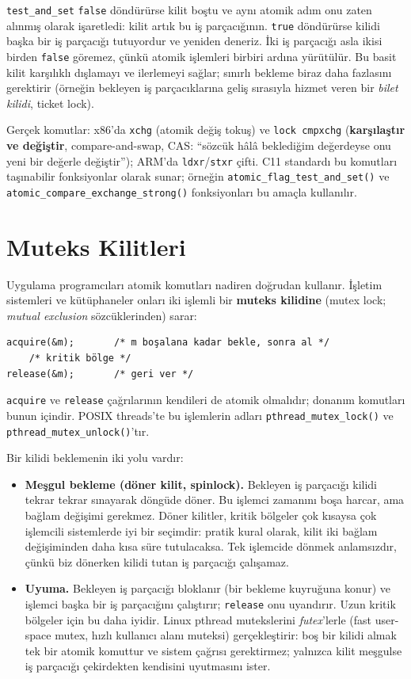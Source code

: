 \documentclass[11pt,a4paper]{article}
\newcommand{\term}[1]{\textbf{\color{mintdeep}#1}}
\newcommand{\cmd}[1]{\texttt{#1}}
\begin{document}
\texttt{test\_and\_set} \texttt{false} döndürürse kilit boştu ve aynı atomik adım onu zaten alınmış olarak işaretledi: kilit artık bu iş parçacığının. \texttt{true} döndürürse kilidi başka bir iş parçacığı tutuyordur ve yeniden deneriz. İki iş parçacığı asla ikisi birden \texttt{false} göremez, çünkü atomik işlemleri birbiri ardına yürütülür. Bu basit kilit karşılıklı dışlamayı ve ilerlemeyi sağlar; sınırlı bekleme biraz daha fazlasını gerektirir (örneğin bekleyen iş parçacıklarına geliş sırasıyla hizmet veren bir \emph{bilet kilidi}, ticket lock).

Gerçek komutlar: x86'da \texttt{xchg} (atomik değiş tokuş) ve \texttt{lock cmpxchg} (\term{karşılaştır ve değiştir}, compare-and-swap, CAS: ``sözcük hâlâ beklediğim değerdeyse onu yeni bir değerle değiştir''); ARM'da \texttt{ldxr}/\texttt{stxr} çifti. C11 standardı bu komutları taşınabilir fonksiyonlar olarak sunar; örneğin \texttt{atomic\_flag\_\allowbreak test\_and\_set()} ve \texttt{atomic\_compare\_\allowbreak exchange\_strong()} fonksiyonları bu amaçla kullanılır.

\section{Muteks Kilitleri}

Uygulama programcıları atomik komutları nadiren doğrudan kullanır. İşletim sistemleri ve kütüphaneler onları iki işlemli bir \term{muteks kilidine} (mutex lock; \emph{mutual exclusion} sözcüklerinden) sarar:
\begin{lstlisting}
acquire(&m);       /* m boşalana kadar bekle, sonra al */
    /* kritik bölge */
release(&m);       /* geri ver */
\end{lstlisting}
\texttt{acquire} ve \texttt{release} çağrılarının kendileri de atomik olmalıdır; donanım komutları bunun içindir. POSIX threads'te bu işlemlerin adları \cmd{pthread\_mutex\_lock()} ve \cmd{pthread\_mutex\_unlock()}'tır.

Bir kilidi beklemenin iki yolu vardır:
\begin{itemize}
  \item \textbf{Meşgul bekleme (döner kilit, spinlock).} Bekleyen iş parçacığı kilidi tekrar tekrar sınayarak döngüde döner. Bu işlemci zamanını boşa harcar, ama bağlam değişimi gerekmez. Döner kilitler, kritik bölgeler çok kısaysa çok işlemcili sistemlerde iyi bir seçimdir: pratik kural olarak, kilit iki bağlam değişiminden daha kısa süre tutulacaksa. Tek işlemcide dönmek anlamsızdır, çünkü biz dönerken kilidi tutan iş parçacığı çalışamaz.
  \item \textbf{Uyuma.} Bekleyen iş parçacığı bloklanır (bir bekleme kuyruğuna konur) ve işlemci başka bir iş parçacığını çalıştırır; \texttt{release} onu uyandırır. Uzun kritik bölgeler için bu daha iyidir. Linux pthread mutekslerini \emph{futex}'lerle (fast user-space mutex, hızlı kullanıcı alanı muteksi) gerçekleştirir: boş bir kilidi almak tek bir atomik komuttur ve sistem çağrısı gerektirmez; yalnızca kilit meşgulse iş parçacığı çekirdekten kendisini uyutmasını ister.
\end{itemize}
\end{document}

